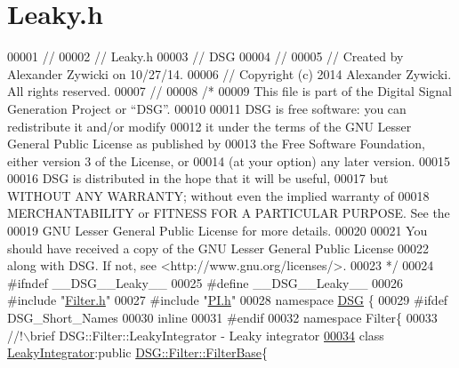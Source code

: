 \hypertarget{_leaky_8h_source}{\section{Leaky.\+h}
\label{_leaky_8h_source}
}

\begin{DoxyCode}
00001 \textcolor{comment}{//}
00002 \textcolor{comment}{//  Leaky.h}
00003 \textcolor{comment}{//  DSG}
00004 \textcolor{comment}{//}
00005 \textcolor{comment}{//  Created by Alexander Zywicki on 10/27/14.}
00006 \textcolor{comment}{//  Copyright (c) 2014 Alexander Zywicki. All rights reserved.}
00007 \textcolor{comment}{//}
00008 \textcolor{comment}{/*}
00009 \textcolor{comment}{ This file is part of the Digital Signal Generation Project or “DSG”.}
00010 \textcolor{comment}{}
00011 \textcolor{comment}{ DSG is free software: you can redistribute it and/or modify}
00012 \textcolor{comment}{ it under the terms of the GNU Lesser General Public License as published by}
00013 \textcolor{comment}{ the Free Software Foundation, either version 3 of the License, or}
00014 \textcolor{comment}{ (at your option) any later version.}
00015 \textcolor{comment}{}
00016 \textcolor{comment}{ DSG is distributed in the hope that it will be useful,}
00017 \textcolor{comment}{ but WITHOUT ANY WARRANTY; without even the implied warranty of}
00018 \textcolor{comment}{ MERCHANTABILITY or FITNESS FOR A PARTICULAR PURPOSE.  See the}
00019 \textcolor{comment}{ GNU Lesser General Public License for more details.}
00020 \textcolor{comment}{}
00021 \textcolor{comment}{ You should have received a copy of the GNU Lesser General Public License}
00022 \textcolor{comment}{ along with DSG.  If not, see <http://www.gnu.org/licenses/>.}
00023 \textcolor{comment}{ */}
00024 \textcolor{preprocessor}{#ifndef \_\_DSG\_\_Leaky\_\_}
00025 \textcolor{preprocessor}{#define \_\_DSG\_\_Leaky\_\_}
00026 \textcolor{preprocessor}{#include "\hyperlink{_filter_8h}{Filter.h}"}
00027 \textcolor{preprocessor}{#include "\hyperlink{_p_i_8h}{PI.h}"}
00028 \textcolor{keyword}{namespace }\hyperlink{namespace_d_s_g}{DSG} \{
00029 \textcolor{preprocessor}{#ifdef DSG\_Short\_Names}
00030     \textcolor{keyword}{inline}
00031 \textcolor{preprocessor}{#endif}
00032     \textcolor{keyword}{namespace }Filter\{\textcolor{comment}{}
00033 \textcolor{comment}{        //!\(\backslash\)brief DSG::Filter::LeakyIntegrator - Leaky integrator }
\hypertarget{_leaky_8h_source_l00034}{}\hyperlink{class_d_s_g_1_1_filter_1_1_leaky_integrator}{00034} \textcolor{comment}{}        \textcolor{keyword}{class }\hyperlink{class_d_s_g_1_1_filter_1_1_leaky_integrator}{LeakyIntegrator}:\textcolor{keyword}{public} \hyperlink{class_d_s_g_1_1_filter_1_1_filter_base}{DSG::Filter::FilterBase}\{

\end{DoxyCode}
